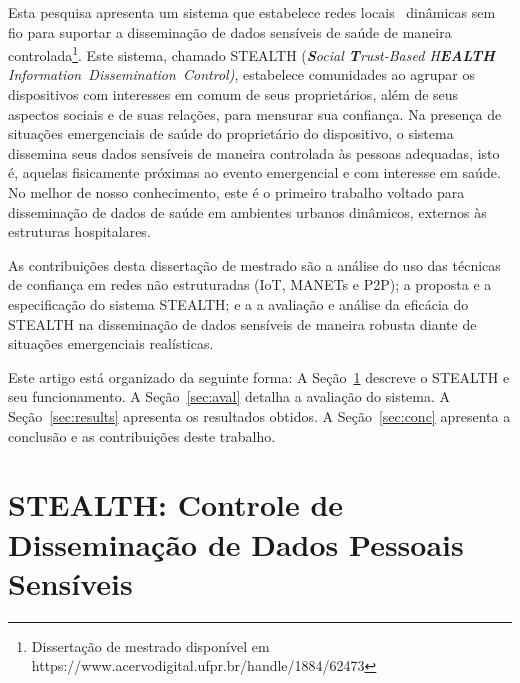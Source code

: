 \documentclass[12pt]{article}
\begin{document}
Esta pesquisa apresenta um sistema que estabelece redes locais ~dinâmicas sem fio para suportar a disseminação de dados sensíveis de saúde de maneira controlada\footnote{Dissertação de mestrado disponível em https://www.acervodigital.ufpr.br/handle/1884/62473}. Este sistema, chamado \mbox{STEALTH} (\textit{\textbf{S}ocial \textbf{T}rust-Based H\textbf{EALTH} \mbox{Information Dissemination Control)}}, 
estabelece 
comunidades ao agrupar os dispositivos com interesses em comum de seus proprietários, além de seus aspectos sociais e de suas relações, para mensurar sua confiança. Na presença de situações emergenciais de saúde do proprietário do dispositivo, o sistema dissemina seus dados sensíveis de maneira controlada às pessoas adequadas, isto é, aquelas fisicamente próximas ao evento emergencial e com interesse em saúde. No melhor de nosso conhecimento, este é o primeiro trabalho voltado para disseminação de dados de saúde em ambientes urbanos dinâmicos, externos às estruturas hospitalares. 


As contribuições desta dissertação de mestrado são a análise do uso das técnicas de confiança em redes não estruturadas (IoT, MANETs e P2P); a proposta e a especificação do sistema \mbox{STEALTH}; e a a avaliação e análise da eficácia do \mbox{STEALTH} na disseminação de dados sensíveis de maneira robusta diante de situações emergenciais realísticas.



Este artigo está organizado da seguinte forma:
A Seção~\ref{sec:sistema} descreve o \mbox{STEALTH} e seu funcionamento. A Seção~\ref{sec:aval} detalha a avaliação do sistema. A Seção~\ref{sec:results} apresenta os resultados obtidos. A Seção~\ref{sec:conc} apresenta a conclusão e as contribuições deste trabalho.



\section{STEALTH: Controle de Disseminação de Dados Pessoais Sensíveis}
\label{sec:sistema}
\end{document}
